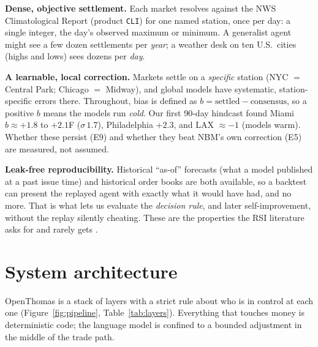 \documentclass[sigconf,review,anonymous]{acmart}
\begin{document}
\textbf{Dense, objective settlement.} Each market resolves against the NWS
Climatological Report (product \texttt{CLI}) for one named station, once per
day: a single integer, the day's observed maximum or minimum. A generalist
agent might see a few dozen settlements per \emph{year}; a weather desk on ten
U.S.\ cities (highs and lows) sees dozens per \emph{day}.

\textbf{A learnable, local correction.} Markets settle on a \emph{specific}
station (NYC $=$ Central Park; Chicago $=$ Midway), and global models have
systematic, station-specific errors there. Throughout, bias is defined as
$b = \text{settled} - \text{consensus}$, so a positive $b$ means the models run
\emph{cold}. Our first 90-day hindcast found Miami $b \approx +1.8$ to
$+2.1$\textdegree{}F ($\sigma\,1.7$), Philadelphia $+2.3$, and LAX $\approx -1$
(models warm). Whether these persist (E9) and whether they beat NBM's own
correction (E5) are measured, not assumed.

\textbf{Leak-free reproducibility.} Historical ``as-of'' forecasts (what a
model published at a past issue time) and historical order books are both
available, so a backtest can present the replayed agent with exactly what it
would have had, and no more. That is what lets us evaluate the \emph{decision
rule}, and later self-improvement, without the replay silently cheating. These
are the properties the RSI literature asks for and rarely gets \cite{harness}.

\section{System architecture}
\label{sec:arch}

OpenThomas is a stack of layers with a strict rule about who is in control at
each one (Figure~\ref{fig:pipeline}, Table~\ref{tab:layers}). Everything that
touches money is deterministic code; the language model is confined to a
bounded adjustment in the middle of the trade path.
\end{document}
